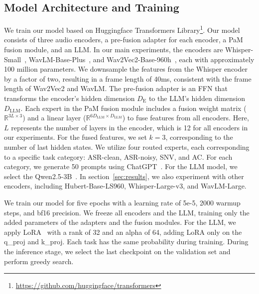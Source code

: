 \subsection{Model Architecture and Training}

We train our model based on Huggingface Transformers Library\footnote{\url{https://github.com/huggingface/transformers}}. Our model consists of three audio encoders, a pre-fusion adapter for each encoder, a PaM fusion module, and an LLM. In our main experiments, the encoders are Whisper-Small~\cite{radford2022robust}, WavLM-Base-Plus~\cite{chen2021wavlm}, and Wav2Vec2-Base-960h~\cite{baevski2020wav2vec}, each with approximately 100 million parameters. We downsample the features from the Whisper encoder by a factor of two, resulting in a frame length of 40ms, consistent with the frame length of Wav2Vec2 and WavLM. The pre-fusion adapter is an FFN that transforms the encoder's hidden dimension $D_{\text{E}}$ to the LLM's hidden dimension $D_{\text{LLM}}$. Each expert in the PaM fusion module includes a fusion weight matrix ($\mathbb{R}^{3L\times3}$) and a linear layer ($\mathbb{R}^{6D_{\text{LLM}}\times D_{\text{LLM}}}$) to fuse features from all encoders. Here, $L$ represents the number of layers in the encoder, which is 12 for all encoders in our experiments. For the fused features, we set $k=3$, corresponding to the number of last hidden states. We utilize four routed experts, each corresponding to a specific task category: ASR-clean, ASR-noisy, SNV, and AC. For each category, we generate 50 prompts using ChatGPT~\cite{gpt2023gpt}. For the LLM model, we select the Qwen2.5-3B~\cite{qwen2.5}. In section~\ref{sec:results}, we also experiment with other encoders, including Hubert-Base-LS960, Whisper-Large-v3, and WavLM-Large.

We train our model for five epochs with a learning rate of 5e-5, 2000 warmup steps, and bf16 precision. We freeze all encoders and the LLM, training only the added parameters of the adapters and the fusion modules. For the LLM, we apply LoRA~\cite{hu2022lora} with a rank of 32 and an alpha of 64, adding LoRA only on the q\_proj and k\_proj. Each task has the same probability during training. During the inference stage, we select the last checkpoint on the validation set and perform greedy search.

